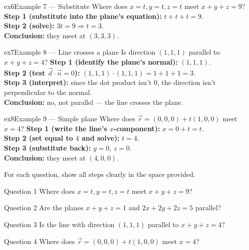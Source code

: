 \documentclass[11pt]{article}
\begin{document}
\begin{example}{ex6}{Example 7 --- Substitute}
Where does $x=t,y=t,z=t$ meet $x+y+z=9$?\soln
\textbf{Step 1 (substitute into the plane's equation):} $t+t+t=9$.\\[3pt]
\textbf{Step 2 (solve):} $3t=9\Rightarrow t=3$.\\[3pt]
\textbf{Conclusion:} they meet at $(3,3,3)$.
\end{example}

\begin{example}{ex7}{Example 8 --- Line crosses a plane}
Is direction $(1,1,1)$ parallel to $x+y+z=4$?\soln
\textbf{Step 1 (identify the plane's normal):} $(1,1,1)$.\\[3pt]
\textbf{Step 2 (test $\vec d\cdot\vec n=0$):} $(1,1,1)\cdot(1,1,1)=1+1+1=3$.\\[3pt]
\textbf{Step 3 (interpret):} since the dot product isn't $0$, the direction isn't perpendicular to the normal.\\[3pt]
\textbf{Conclusion:} no, not parallel --- the line crosses the plane.
\end{example}

\begin{example}{ex8}{Example 9 --- Simple plane}
Where does $\vec r=(0,0,0)+t(1,0,0)$ meet $x=4$?\soln
\textbf{Step 1 (write the line's $x$-component):} $x=0+t=t$.\\[3pt]
\textbf{Step 2 (set equal to $4$ and solve):} $t=4$.\\[3pt]
\textbf{Step 3 (substitute back):} $y=0$, $z=0$.\\[3pt]
\textbf{Conclusion:} they meet at $(4,0,0)$.
\end{example}

\clearpage
{}
For each question, show all steps clearly in the space provided.

\begin{qbox}{Question 1}
Where does $x=t,y=t,z=t$ meet $x+y+z=9$?\workspace{2.4cm}
\end{qbox}

\begin{qbox}{Question 2}
Are the planes $x+y+z=1$ and $2x+2y+2z=5$ parallel?\workspace{2.4cm}
\end{qbox}

\begin{qbox}{Question 3}
Is the line with direction $(1,1,1)$ parallel to $x+y+z=4$?\workspace{2.4cm}
\end{qbox}

\begin{qbox}{Question 4}
Where does $\vec r=(0,0,0)+t(1,0,0)$ meet $x=4$?\workspace{2.4cm}
\end{qbox}
\end{document}
